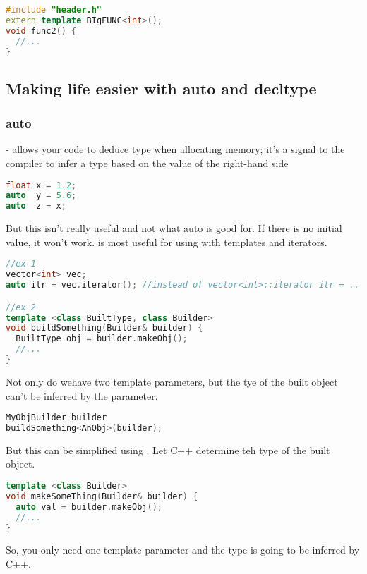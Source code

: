 \begin{lstlisting}[language=C++]
#include "header.h"
extern template BIgFUNC<int>();
void func2() {
  //...
}
\end{lstlisting}


\subsection{Making life easier with auto and decltype}

\subsubsection{auto}

 - allows your code to deduce type when allocating memory; it's a signal to the compiler to infer a type based on the value of the right-hand side

\begin{lstlisting}[language=C++]
float x = 1.2;
auto  y = 5.6;
auto  z = x;
\end{lstlisting}

But this isn't really useful and not what auto is good for. If there is no initial value, it won't work.  is most useful for using with templates and iterators.

\begin{lstlisting}[language=C++]
//ex 1
vector<int> vec;
auto itr = vec.iterator(); //instead of vector<int>::iterator itr = ...

//ex 2
template <class BuiltType, class Builder>
void buildSomething(Builder& builder) {
  BuiltType obj = builder.makeObj();
  //...
}
\end{lstlisting}

Not only do wehave two template parameters, but the tye of the built object can't be inferred by the parameter.

\begin{lstlisting}[language=C++]
MyObjBuilder builder
buildSomething<AnObj>(builder);
\end{lstlisting}

But this can be simplified using . Let C++ determine teh type of the built object.

\begin{lstlisting}[language=C++]
template <class Builder>
void makeSomeThing(Builder& builder) {
  auto val = builder.makeObj();
  //...
}
\end{lstlisting}

So, you only need one template parameter and the type is going to be inferred by C++.

